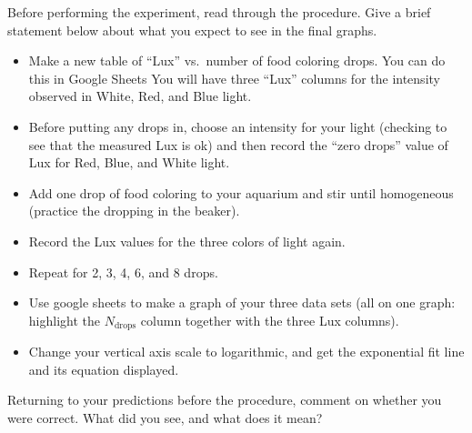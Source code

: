 \noindent Before performing the experiment, read through the procedure.  Give a brief statement below about what you expect to see in the final graphs.\\[-6pt]

\vspace{4cm}

	\begin{itemize}
	\item Make a new table of ``Lux'' vs.\ number of food coloring drops.  You can do this in Google Sheets  You will have three ``Lux'' columns for the intensity observed in White, Red, and Blue light.  
	\item Before putting any drops in, choose an intensity for your light (checking to see that the measured Lux is ok) and then record the ``zero drops'' value of Lux for Red, Blue, and White light.
	\item Add one drop of food coloring to your aquarium and stir until homogeneous (practice the dropping in the beaker).  
	\item Record the Lux values for the three colors of light again.
	\item Repeat for 2, 3, 4, 6, and 8 drops.
	\item Use google sheets to make a graph of your three data sets (all on one graph: highlight the $N_\text{drops}$ column together with the three Lux columns).
	\item Change your vertical axis scale to logarithmic, and get the exponential fit line and its equation displayed.
	\end{itemize}
\noindent Returning to your predictions before the procedure, comment on whether you were correct.  What did you see, and what does it mean?















 